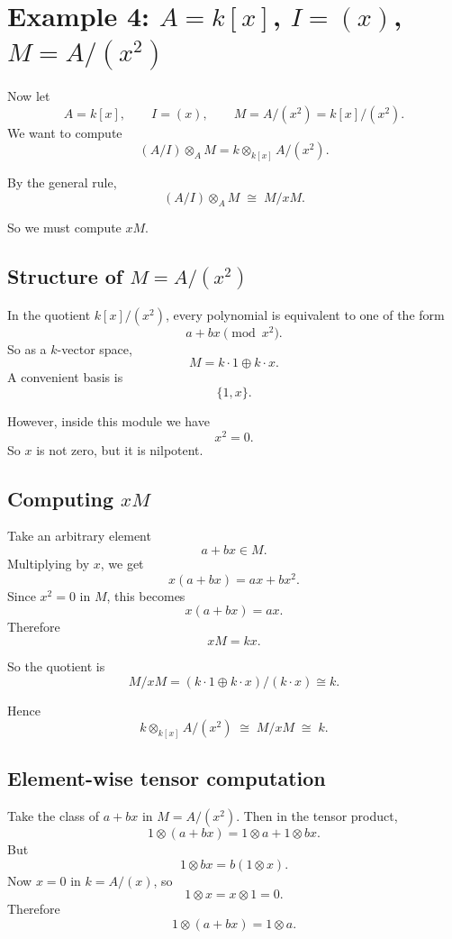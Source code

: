 \documentclass[12pt,a4paper]{article}
\theoremstyle{plain}
\theoremstyle{definition}      %
\begin{document}
	\section{Example 4: \texorpdfstring{$A=k[x]$, $I=(x)$, $M=A/(x^2)$}{A=k[x], I=(x), M=A/(x\^2)}}
	
	Now let
	\[
	A=k[x], \qquad I=(x), \qquad M=A/(x^2)=k[x]/(x^2).
	\]
	We want to compute
	\[
	(A/I)\otimes_A M
	=
	k\otimes_{k[x]} A/(x^2).
	\]
	
	By the general rule,
	\[
	(A/I)\otimes_A M
	\;\cong\;
	M/xM.
	\]
	
	So we must compute \(xM\).
	
	\subsection{Structure of \texorpdfstring{$M=A/(x^2)$}{M=A/(x\^2)}}
	
	In the quotient \(k[x]/(x^2)\), every polynomial is equivalent to one of the form
	\[
	a+bx \pmod{x^2}.
	\]
	So as a \(k\)-vector space,
	\[
	M = k\cdot 1 \oplus k\cdot x.
	\]
	A convenient basis is
	\[
	\{1,x\}.
	\]
	
	However, inside this module we have
	\[
	x^2=0.
	\]
	So \(x\) is not zero, but it is nilpotent.
	
	\subsection{Computing \texorpdfstring{$xM$}{xM}}
	
	Take an arbitrary element
	\[
	a+bx \in M.
	\]
	Multiplying by \(x\), we get
	\[
	x(a+bx)=ax+bx^2.
	\]
	Since \(x^2=0\) in \(M\), this becomes
	\[
	x(a+bx)=ax.
	\]
	Therefore
	\[
	xM = kx.
	\]
	
	So the quotient is
	\[
	M/xM = (k\cdot 1 \oplus k\cdot x)/(k\cdot x)\cong k.
	\]
	
	Hence
	\[
	k\otimes_{k[x]} A/(x^2)
	\;\cong\;
	M/xM
	\;\cong\;
	k.
	\]
	
	\subsection{Element-wise tensor computation}
	
	Take the class of \(a+bx\) in \(M=A/(x^2)\). Then in the tensor product,
	\[
	1\otimes (a+bx)
	=
	1\otimes a + 1\otimes bx.
	\]
	But
	\[
	1\otimes bx = b(1\otimes x).
	\]
	Now \(x=0\) in \(k=A/(x)\), so
	\[
	1\otimes x = x\otimes 1 = 0.
	\]
	Therefore
	\[
	1\otimes (a+bx)=1\otimes a.
	\]
	
\end{document}
